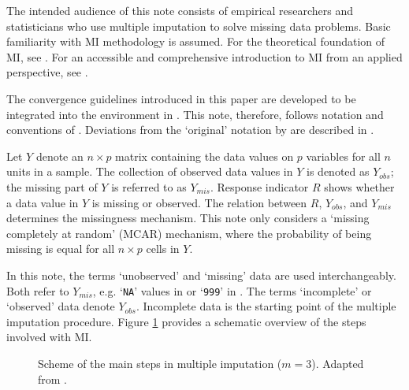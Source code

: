 \documentclass[article]{jss}
\begin{document}
The intended audience of this note consists of empirical researchers and statisticians who use multiple imputation to solve missing data problems. Basic familiarity with MI methodology is assumed. For the theoretical foundation of MI, see \cite{rubin87}. For an accessible and comprehensive introduction to MI from an applied perspective, see \cite{buur18}.  

The convergence guidelines introduced in this paper are developed to be integrated into the  environment \citep{mice} in  \citep{R}. This note, therefore, follows notation and conventions of \cite{mice}. Deviations from the `original' notation by \cite{rubin87} are described in \citep[\S~2.2.3]{buur18}. 

Let $Y$ denote an $n \times p$ matrix containing the data values on $p$ variables for all $n$ units in a sample. The collection of observed data values in $Y$ is denoted as $Y_{obs}$; the missing part of $Y$ is referred to as $Y_{mis}$. Response indicator $R$ shows whether a data value in $Y$ is missing or observed. The relation between $R$, $Y_{obs}$, and $Y_{mis}$ determines the missingness mechanism. This note only considers a `missing completely at random' (MCAR) mechanism, where the probability of being missing is equal for all $n \times p$ cells in $Y$.

In this note, the terms `unobserved' and `missing' data are used interchangeably. Both refer to $Y_{mis}$, e.g. `\texttt{NA}' values in  or `\texttt{999}' in . The terms `incomplete' or `observed' data denote $Y_{obs}$. Incomplete data is the starting point of the multiple imputation procedure. Figure \ref{fig:steps} provides a schematic overview of the steps involved with MI.

\begin{figure}
\label{fig:steps}
\centering
	\large{}
\caption{Scheme of the main steps in multiple imputation ($m = 3$). Adapted from \citep[\S~1.4.1]{buur18}.}
\end{figure}
\end{document}

